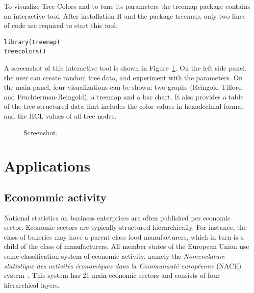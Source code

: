 \documentclass[journal]{vgtc}                %
\begin{document}
To visualize Tree Colors and to tune its parameters the \textsf{treemap} package contains an interactive tool. After installation R and the package treemap, only two lines of code are required to start this tool:

\begin{verbatim}
library(treemap)
treecolors()
\end{verbatim}

A screenshot of this interactive tool is shown in Figure~\ref{fig:screen}. On the left side panel, the user can create random tree data, and experiment with the parameters. On the main panel, four visualizations can be shown: two graphs (Reingold-Tilford and Fruchterman-Reingold), a treemap and a bar chart. It also provides a table of the tree structured data that includes the color values in hexadecimal format and the HCL values of all tree nodes.

\begin{figure}[tb]
  \centering
  \caption{Screenshot.}\label{fig:screen}
\end{figure}



\section{Applications}\label{secapplication}

\subsection{Econommic activity}

National statistics on business enterprises are often published per economic sector. Economic sectors are typically structured hierarchically. For instance, the class of bakeries may have a parent class food manufacturers, which in turn is a child of the class of manufacturers. All member states of the European Union use same classification system of economic activity, namely the \textit{Nomenclature statistique des activit\'es \'economiques dans la Communaut\'e europ\'eenne} (NACE) system~\cite{nace}. This system has 21 main economic sectors and consists of four hierarchical layers.
\end{document}
